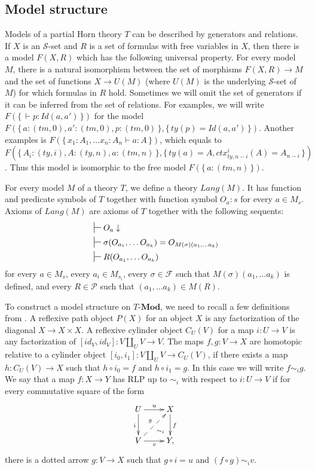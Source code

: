 \documentclass{mscs}
\newcommand{\cat}[1]{\mathbf{#1}}
\newcommand{\Mod}[1]{#1\text{-}\cat{Mod}}
\newcommand{\cyli}{i}
\numberwithin{figure}{section}
\begin{document}
\subsection{Model structure}

Models of a partial Horn theory $T$ can be described by generators and relations.
If $X$ is an $\mathcal{S}$-set and $R$ is a set of formulas with free variables in $X$,
then there is a model $F(X,R)$ which has the following universal property.
For every model $M$, there is a natural isomorphism between the set of morphisms $F(X,R) \to M$
and the set of functions $X \to U(M)$ (where $U(M)$ is the underlying $\mathcal{S}$-set of $M$) for which formulas in $R$ hold.
Sometimes we will omit the set of generators if it can be inferred from the set of relations.
For examples, we will write $F(\{\,\vdash p : Id(a,a')\,\})$ for the model $F(\{\,a : (tm,0), a' : (tm,0), p : (tm,0)\,\}, \{\,ty(p) = Id(a,a')\,\})$.
Another examples is $F(\{\,x_1 : A_1, \ldots x_n : A_n \vdash a : A\,\})$,
which equals to $F(\{\,A_i : (ty,i), A : (ty,n), a : (tm,n)\,\}, \{\,ty(a) = A, ctx^i_{ty,n-i}(A) = A_{n-i}\,\})$.
Thus this model is isomorphic to the free model $F(\{\,a : (tm,n)\,\})$.

For every model $M$ of a theory $T$, we define a theory $Lang(M)$.
It has function and predicate symbols of $T$ together with function symbol $O_a : s$ for every $a \in M_s$.
Axioms of $Lang(M)$ are axioms of $T$ together with the following sequents:
\begin{align*}
& \sststile{}{} O_a \downarrow \\
& \sststile{}{} \sigma(O_{a_1}, \ldots O_{a_k}) = O_{M(\sigma)(a_1, \ldots a_k)} \\
& \sststile{}{} R(O_{a_1}, \ldots O_{a_k})
\end{align*}
for every $a \in M_s$, every $a_i \in M_{s_i}$,
every $\sigma \in \mathcal{F}$ such that $M(\sigma)(a_1, \ldots a_k)$ is defined,
and every $R \in \mathcal{P}$ such that $(a_1, \ldots a_k) \in M(R)$.

To construct a model structure on $\Mod{T}$, we need to recall a few definitions from \cite{f-model-structures}.
A reflexive path object $P(X)$ for an object $X$ is any factorization of the diagonal $X \to X \times X$.
A reflexive cylinder object $C_U(V)$ for a map $i : U \to V$ is any factorization of $[id_V,id_V] : V \amalg_U V \to V$.
The maps $f,g : V \to X$ are homotopic relative to a cylinder object $[\cyli_0,\cyli_1] : V \amalg_U V \to C_U(V)$, if there exists a map $h : C_U(V) \to X$
such that $h \circ \cyli_0 = f$ and $h \circ \cyli_1 = g$.
In this case we will write $f \sim_i g$.
We say that a map $f : X \to Y$ has RLP up to $\sim_i$ with respect to $i : U \to V$ if for every commutative square of the form
\[ \xymatrix{ U \ar[r]^u \ar@{}[dr]|(.7){\sim_i} \ar[d]_i & X \ar[d]^f \\
              V \ar[r]_v \ar@{-->}[ur]^g                  & Y,
            } \]
there is a dotted arrow $g : V \to X$ such that $g \circ i = u$ and $(f \circ g) \sim_i v$.
\end{document}
